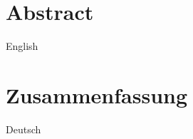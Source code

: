 \section*{Abstract}

\thispagestyle{empty}

    English

\cleardoublepage

\thispagestyle{empty}

\section*{Zusammenfassung}
    
    Deutsch

\cleardoublepage
